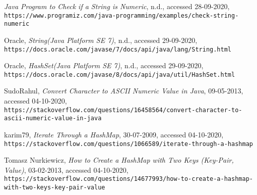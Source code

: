 \documentclass{article}
\begin{document}
\begin{thebibliography}{10}
\textit{Java Program to Check if a String is Numeric}, n.d., accessed 28-09-2020, \\\texttt{https://www.programiz.com/java-programming/examples/check-string-numeric}

Oracle, \textit{String(Java Platform SE 7)}, n.d., accessed 29-09-2020, \\\texttt{https://docs.oracle.com/javase/7/docs/api/java/lang/String.html}

Oracle, \textit{HashSet(Java Platform SE 7)}, n.d., accessed 29-09-2020, \\\texttt{https://docs.oracle.com/javase/8/docs/api/java/util/HashSet.html}

SudoRahul, \textit{Convert Character to ASCII Numeric Value in Java}, 09-05-2013, accessed 04-10-2020, \\\texttt{https://stackoverflow.com/questions/16458564/convert-character-to-ascii-numeric-value-in-java}

karim79, \textit{Iterate Through a HashMap}, 30-07-2009, accessed 04-10-2020, \\\texttt{https://stackoverflow.com/questions/1066589/iterate-through-a-hashmap}

Tomasz Nurkiewicz, \textit{How to Create a HashMap with Two Keys (Key-Pair, Value)}, 03-02-2013, accessed 04-10-2020, \\\texttt{https://stackoverflow.com/questions/14677993/how-to-create-a-hashmap-with-two-keys-key-pair-value}
\end{thebibliography}
\end{document}
